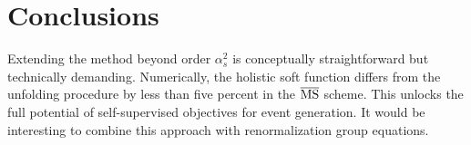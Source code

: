 \section{Conclusions}\label{sec:conclusions}

Extending the method beyond order $\alpha_s^2$ is conceptually
straightforward but technically demanding. Numerically, the holistic
soft function differs from the unfolding procedure by less than five
percent in the $\overline{\rm MS}$ scheme. This unlocks the full
potential of self-supervised objectives for event generation. It would
be interesting to combine this approach with renormalization group
equations.

